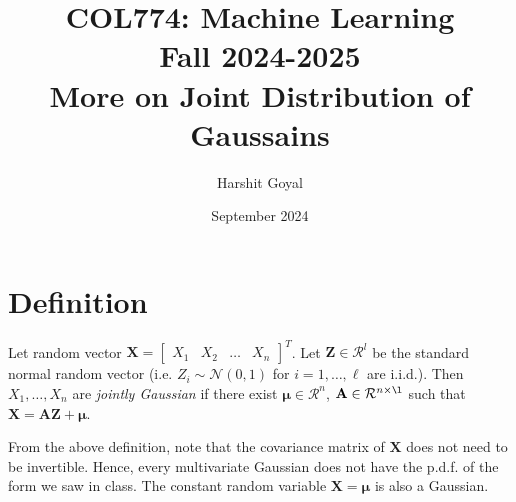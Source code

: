 \documentclass{article}
\title{COL774: Machine Learning\\Fall 2024-2025\\More on Joint Distribution of Gaussains}
\author{Harshit Goyal}
\date{September 2024}
\begin{document}
\maketitle
\section{Definition}
Let random vector $\mathbf{X} = \begin{bmatrix}X_1 & X_2 & \dots & X_n\end{bmatrix}^T$. Let $\mathbf{Z} \in \mathcal{R}^l$ be the standard normal random vector (i.e. $Z_i \sim \mathcal{N}(0,1)$ for $i=1,\dots,\ell$ are i.i.d.). Then $X_1,\dots, X_n$ are \textit{jointly Gaussian} if there exist $\boldsymbol{\mu} \in \mathcal{R}^n$, $\mathbf{A} \in \mathcal{R}^{n \times \l}$ such that $\mathbf{X} = \mathbf{A} \mathbf{Z} + \boldsymbol{\mu}$.

From the above definition, note that the covariance matrix of $\mathbf{X}$ does not need to be invertible. Hence, every multivariate Gaussian does not have the p.d.f. of the form we saw in class. The constant random variable $\mathbf{X} = \boldsymbol{\mu}$ is also a Gaussian.
\end{document}
